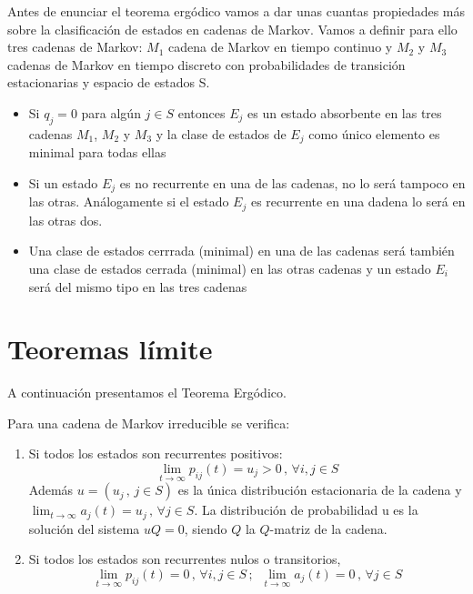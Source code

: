 \documentclass[12pt,a4paper]{article}
\begin{document}
   Antes de enunciar el teorema ergódico vamos a dar unas cuantas propiedades más sobre la clasificación de estados en cadenas de Markov. Vamos a definir para ello tres cadenas de Markov: $M_1$ cadena de Markov en tiempo continuo y $M_2$ y $M_3$ cadenas de Markov en tiempo discreto con probabilidades de transición estacionarias y espacio de estados S.\\
   
   
   \begin{itemize}
   	\item Si $q_j=0$  para algún $j\in S$ entonces $E_j$ es un estado absorbente en las tres cadenas $M_1$, $M_2$ y $M_3$ y la clase de estados de $E_j$ como único elemento es minimal para todas ellas\\
   	
   	\item Si un estado $E_j$ es no recurrente en una de las cadenas, no lo será tampoco en las otras. Análogamente si el estado $E_j$ es recurrente en una dadena lo será en las otras dos.\\
   	
   	\item Una clase de estados cerrrada (minimal) en una de las cadenas será también una clase de estados cerrada (minimal) en las otras cadenas y un estado $E_i$ será del mismo tipo en las tres cadenas
      \end{itemize}
   
\section{Teoremas límite}
A continuación presentamos el Teorema Ergódico.
\begin{theorem}
Para una cadena de Markov irreducible se verifica:
\begin{enumerate}
\item Si todos los estados son recurrentes positivos:
$$\lim_{t\rightarrow\infty}p_{ij}(t)=u_j>0 \, , \, \forall i,j\in S$$
Además $u=(u_j \, , \, j\in S)$ es la única distribución estacionaria de la cadena y $\displaystyle\lim_{t\rightarrow\infty}a_j (t)=u_j \, , \, \forall j\in S$. La distribución de probabilidad u es la solución del sistema $uQ=0$, siendo $Q$ la $Q$-matriz de la cadena.
\item Si todos los estados son recurrentes nulos o transitorios,
$$\lim_{t\rightarrow\infty}p_{ij}(t)=0\, , \, \forall i,j \in S\, ;\,\,\, \lim_{t\rightarrow\infty}a_j (t)=0\, , \, \forall j\in S$$
\end{enumerate}
\end{theorem}
\end{document}
